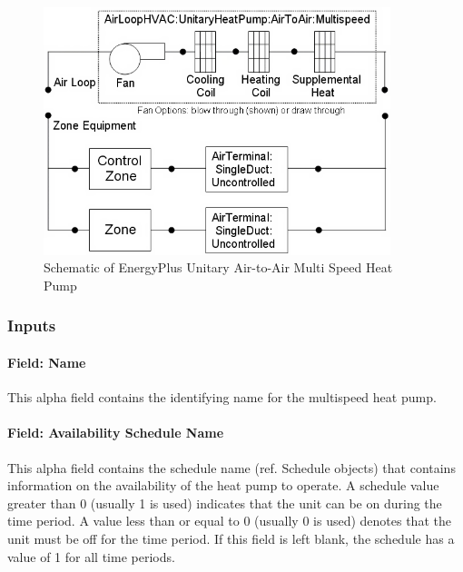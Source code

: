 \begin{figure}[hbtp] %
\centering
\includegraphics[width=0.9\textwidth, height=0.9\textheight, keepaspectratio=true]{media/image301.png}
\caption{Schematic of EnergyPlus Unitary Air-to-Air Multi Speed Heat Pump \protect \label{fig:schematic-of-energyplus-unitary-air-to-air}}
\end{figure}

\subsubsection{Inputs}\label{inputs-4-036}

\paragraph{Field: Name}\label{field-name-5-027}

This alpha field contains the identifying name for the multispeed heat pump.

\paragraph{Field: Availability Schedule Name}\label{field-availability-schedule-name-4-006}

This alpha field contains the schedule name (ref. Schedule objects) that contains information on the availability of the heat pump to operate. A schedule value greater than 0 (usually 1 is used) indicates that the unit can be on during the time period. A value less than or equal to 0 (usually 0 is used) denotes that the unit must be off for the time period. If this field is left blank, the schedule has a value of 1 for all time periods.

